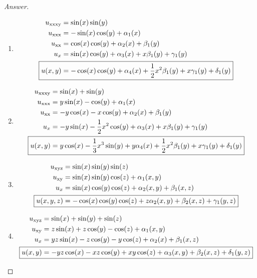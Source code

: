 \documentclass{article}
\theoremstyle{definition}
\renewcommand\qedsymbol{$\blacksquare$}
\newenvironment{ans}{\begin{proof}[Answer]\renewcommand{\qedsymbol}{}}{\end{proof}}
\begin{document}
\begin{ans}
\begin{enumerate}[resume*=answers]
				\item \begin{align*}
					u_{\mathrm{xxxy}} &= \sin(x)\sin(y) 
					\\ u_{\mathrm{xxx}} &= -\sin(x)\cos(y) + \alpha_1(x)
					\\ u_{\mathrm{xx}} &= \cos(x)\cos(y) + \alpha_2(x) + \beta_1(y)
					\\ u_x &= \sin(x)\cos(y) + \alpha_3(x) + x\beta_1(y) + \gamma_1(y)
					\\ \Aboxed{u(x,y) &= -\cos(x)\cos(y) + \alpha_4(x) + \frac{1}{2}x^2\beta_1(y) + x\gamma_1(y) + \delta_1(y)}
				\end{align*}
				
				\item \begin{align*}
					u_{\mathrm{xxxy}} &= \sin(x)+\sin(y) 
					\\ u_{\mathrm{xxx}} &= y\sin(x) - \cos(y) + \alpha_1(x)
					\\ u_{\mathrm{xx}} &= -y\cos(x) - x\cos(y) + \alpha_2(x) + \beta_1(y)
					\\ u_x &= -y\sin(x) - \frac{1}{2}x^2\cos(y) + \alpha_3(x) + x\beta_1(y) + \gamma_1(y)
					\\ \Aboxed{u(x,y) &= y\cos(x) - \frac{1}{3}x^3\sin(y) + y\alpha_4(x) + \frac{1}{2}x^2\beta_1(y) + x\gamma_1(y) +\delta_1(y)}
				\end{align*}
				
				\item \begin{align*}
					u_{\mathrm{xyz}} &= \sin(x)\sin(y)\sin(z)
					\\ u_{\mathrm{xy}} &= \sin(x)\sin(y)\cos(z) + \alpha_1(x,y)
					\\ u_x &= \sin(x)\cos(y)\cos(z) + \alpha_2(x, y) + \beta_1(x, z)
					\\ \Aboxed{u(x,y, z) &= -\cos(x)\cos(y)\cos(z) + z\alpha_2(x,y) + \beta_2(x, z) + \gamma_1(y, z)}
				\end{align*}
				
				\item \begin{align*}
					u_{\mathrm{xyz}} &= \sin(x)+\sin(y)+\sin(z)
					\\ u_{\mathrm{xy}} &= z\sin(x) + z\cos(y) - \cos(z) + \alpha_1(x, y)
					\\ u_x &=  yz\sin(x) - z\cos(y) - y\cos(z) + \alpha_2(x) + \beta_1(x,z)
					\\ \Aboxed{u(x,y) &= -yz\cos(x) - xz\cos(y) + xy\cos(z) + \alpha_3(x, y) + \beta_2(x,z) +\delta_1(y,z)}
				\end{align*}
				

\end{enumerate}
\end{ans}
\end{document}

